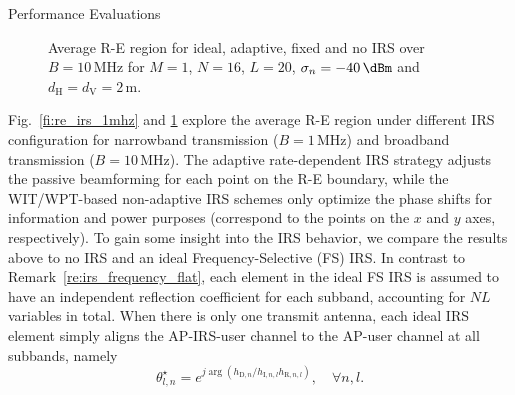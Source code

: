 \documentclass[journal]{IEEEtran}
\begin{document}
\begin{section}{Performance Evaluations}
		\begin{figure}[!t]
			\centering
			\begin{adjustbox}{width=0.9\columnwidth}
				
			\end{adjustbox}
			\caption{Average R-E region for ideal, adaptive, fixed and no IRS over $B=10\,\si{\MHz}$ for $M=1$, $N=16$, $L=20$, $\sigma_n=-40\,\si{\dBm}$ and $d_{\mathrm{H}}=d_{\mathrm{V}}=2\,\si{\meter}$.}
			\label{fi:re_irs_10mhz}
		\end{figure}

		Fig.~\ref{fi:re_irs_1mhz} and \ref{fi:re_irs_10mhz} explore the average R-E region under different IRS configuration for narrowband transmission ($B=1\,\si{\MHz}$) and broadband transmission ($B=10\,\si{\MHz}$). The adaptive rate-dependent IRS strategy adjusts the passive beamforming for each point on the R-E boundary, while the WIT/WPT-based non-adaptive IRS schemes only optimize the phase shifts for information and power purposes (correspond to the points on the $x$ and $y$ axes, respectively). To gain some insight into the IRS behavior, we compare the results above to no IRS and an ideal Frequency-Selective (FS) IRS. In contrast to Remark~\ref{re:irs_frequency_flat}, each element in the ideal FS IRS is assumed to have an independent reflection coefficient for each subband, accounting for $NL$ variables in total. When there is only one transmit antenna, each ideal IRS element simply aligns the AP-IRS-user channel to the AP-user channel at all subbands, namely
		\begin{equation}
			\theta_{l,n}^{\star}=e^{j\arg{\left(h_{\mathrm{D},n}/h_{\mathrm{I},n,l}h_{\mathrm{R},n,l}\right)}},\quad \forall n,l.
		\end{equation}

\end{section}
\end{document}
